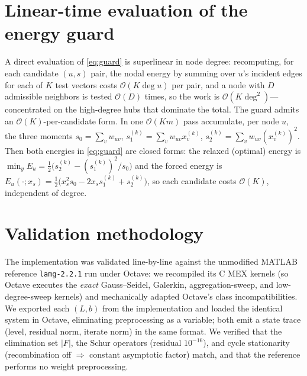 \documentclass[review]{siamart220329}
\begin{document}
\section{Linear-time evaluation of the energy guard}\label{sec:guardeval}
A direct evaluation of \eqref{eq:guard} is superlinear in node degree: recomputing, for each candidate
$(u,s)$ pair, the nodal energy by summing over $u$'s incident edges for each of $K$ test
vectors costs $\mathcal{O}(K\deg u)$ per pair, and a node with $D$ admissible neighbors is
tested $\mathcal{O}(D)$ times, so the work is $\mathcal{O}(K\deg^2)$---concentrated on the
high-degree hubs that dominate the total. The guard admits an $\mathcal{O}(K)$-per-candidate
form. In one $\mathcal{O}(Km)$ pass accumulate, per node $u$, the three moments
$s_0=\sum_v w_{uv}$, $s_1^{(k)}=\sum_v w_{uv}x^{(k)}_v$, $s_2^{(k)}=\sum_v w_{uv}(x^{(k)}_v)^2$.
Then both energies in \eqref{eq:guard} are closed forms: the relaxed (optimal) energy is
$\min_y E_u=\tfrac12\big(s_2^{(k)}-(s_1^{(k)})^2/s_0\big)$ and the forced energy is
$E_u(\cdot;x_s)=\tfrac12\big(x_s^2 s_0-2x_s s_1^{(k)}+s_2^{(k)}\big)$, so each candidate costs
$\mathcal{O}(K)$, independent of degree.

\section{Validation methodology}\label{sec:valid}
The implementation was validated line-by-line against the unmodified MATLAB reference
\texttt{lamg-2.2.1} run under Octave: we recompiled its C MEX kernels (so Octave executes the
\emph{exact} Gauss--Seidel, Galerkin, aggregation-sweep, and low-degree-sweep kernels) and
mechanically adapted Octave's class incompatibilities. We exported each $(L,b)$ from the implementation and loaded the identical
system in Octave, eliminating preprocessing as a variable; both emit a state trace (level,
residual norm, iterate norm) in the same format. We verified that the elimination set $|F|$,
the Schur operators (residual $10^{-16}$), and cycle stationarity (recombination off
$\Rightarrow$ constant asymptotic factor) match, and that the reference performs no weight
preprocessing.
\end{document}
